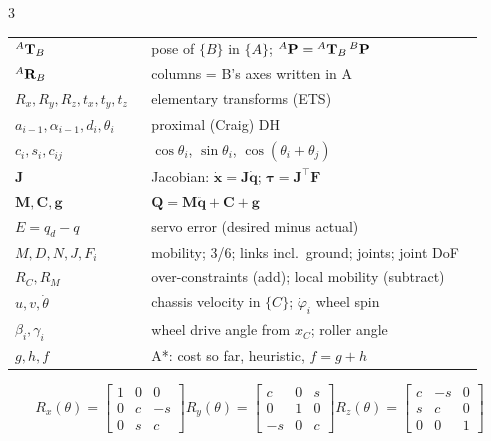 \begin{multicols}{3}
\columnbreak
{}
\begin{tabular}{@{}p{0.27\linewidth}p{0.66\linewidth}@{}}
${}^{A}\mathbf T_{B}$ & pose of $\{B\}$ in $\{A\}$; $^A\mathbf P={}^{A}\mathbf T_{B}\,{}^B\mathbf P$\\
$^A\mathbf R_B$ & columns = B's axes written in A\\
$R_x,R_y,R_z,t_x,t_y,t_z$ & elementary transforms (ETS)\\
$a_{i-1},\alpha_{i-1},d_i,\theta_i$ & proximal (Craig) DH\\
$c_i,s_i,c_{ij}$ & $\cos\theta_i$, $\sin\theta_i$, $\cos(\theta_i{+}\theta_j)$\\
$\mathbf J$ & Jacobian: $\dot{\mathbf x}=\mathbf J\dot{\mathbf q}$; $\boldsymbol\tau=\mathbf J^\top\mathbf F$\\
$\mathbf M,\mathbf C,\mathbf g$ & $\mathbf Q=\mathbf M\ddot{\mathbf q}+\mathbf C+\mathbf g$\\
$E=q_d-q$ & servo error (desired minus actual)\\
$M,D,N,J,F_i$ & mobility; 3/6; links incl.\ ground; joints; joint DoF\\
$R_C,R_M$ & over-constraints (add); local mobility (subtract)\\
$u,v,\dot\theta$ & chassis velocity in $\{C\}$; $\dot\varphi_i$ wheel spin\\
$\beta_i,\gamma_i$ & wheel drive angle from $x_C$; roller angle\\
$g,h,f$ & A*: cost so far, heuristic, $f=g+h$\\
\end{tabular}

\[R_x(\theta)=\begin{bmatrix}1&0&0\\0&c&-s\\0&s&c\end{bmatrix}
R_y(\theta)=\begin{bmatrix}c&0&s\\0&1&0\\-s&0&c\end{bmatrix}
R_z(\theta)=\begin{bmatrix}c&-s&0\\s&c&0\\0&0&1\end{bmatrix}\]


\end{multicols}
